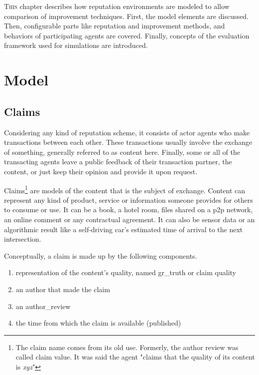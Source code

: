 \documentclass[%
    ]{\PathToTumTemplate/thesis/tum_thesis}
\begin{document}
\lettrine{T}{his} chapter describes how reputation environments are modeled to allow comparison of improvement techniques.
First, the model elements are discussed.
Then, configurable parts like reputation and improvement methods, and behaviors of participating agents are covered.
Finally, concepts of the evaluation framework used for simulations are introduced.



\section{Model}\label{sec:approach_model}

\subsection{Claims}\label{sec:approach_claims}
Considering any kind of reputation scheme, it consists of actor agents who make transactions between each other.
These transactions usually involve the exchange of something, generally referred to as content here.
Finally, some or all of the transacting agents leave a public feedback of their transaction partner, the content, or just keep their opinion and provide it upon request.

Claims\footnote{The claim name comes from its old use. Formerly, the author review was called claim value. It was said the agent "claims that the quality of its content is \emph{xyz}"} are models of the content that is the subject of exchange.
Content can represent any kind of product, service or information someone provides for others to consume or use.
It can be a book, a hotel room, files shared on a \acrlong{p2p} network, an online comment or any contractual agreement.
It can also be sensor data or an algorithmic result like a self-driving car's estimated time of arrival to the next intersection.

Conceptually, a claim is made up by the following components.
\begin{enumerate}
	\item representation of the content's quality, named \gls{gr_truth} or claim quality
	\item an author that made the claim
	\item an \gls{author_review}
	\item the time from which the claim is available (published)
\end{enumerate}
\end{document}

